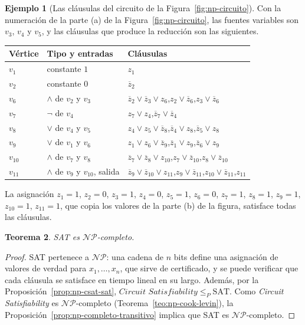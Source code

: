 \documentclass[12pt, spanish, oneside, openany]{book}
\newcommand{\NP}{\mathcal{NP}}
\newcommand{\redp}{\le_{P}}
\newcommand{\prob}[1]{\textit{#1}}
\newcommand{\CSAT}{\prob{Circuit Satisfiability}\xspace}
\newcommand{\nega}[1]{\overline{#1}} %
\theoremstyle{uprightplain}
\newtheorem{teorema}{Teorema}[section]
\theoremstyle{definition}
\newtheorem{ejemplo}[teorema]{Ejemplo}
\theoremstyle{remark}
\theoremstyle{definition}
\begin{document}
\begin{ejemplo}[Las cláusulas del circuito de la Figura~\ref{fig:np-circuito}]
\label{ej:np-circuito-clausulas}
Con la numeración de la parte (a) de la Figura~\ref{fig:np-circuito}, las fuentes variables son $v_3$, $v_4$ y $v_5$, y las cláusulas que produce la reducción son las siguientes.
\begin{center}
\small
\renewcommand{\arraystretch}{1.2}
\begin{tabular}{@{}lll@{}}
\toprule
\textbf{Vértice} & \textbf{Tipo y entradas} & \textbf{Cláusulas}\\
\midrule
$v_1$ & constante $1$ & $z_1$\\
$v_2$ & constante $0$ & $\nega{z}_2$\\
$v_6$ & $\wedge$ de $v_2$ y $v_3$ & $\nega{z}_2\vee\nega{z}_3\vee z_6$,\quad $z_2\vee\nega{z}_6$,\quad $z_3\vee\nega{z}_6$\\
$v_7$ & $\neg$ de $v_4$ & $z_7\vee z_4$,\quad $\nega{z}_7\vee\nega{z}_4$\\
$v_8$ & $\vee$ de $v_4$ y $v_5$ & $z_4\vee z_5\vee\nega{z}_8$,\quad $\nega{z}_4\vee z_8$,\quad $\nega{z}_5\vee z_8$\\
$v_9$ & $\vee$ de $v_1$ y $v_6$ & $z_1\vee z_6\vee\nega{z}_9$,\quad $\nega{z}_1\vee z_9$,\quad $\nega{z}_6\vee z_9$\\
$v_{10}$ & $\wedge$ de $v_7$ y $v_8$ & $\nega{z}_7\vee\nega{z}_8\vee z_{10}$,\quad $z_7\vee\nega{z}_{10}$,\quad $z_8\vee\nega{z}_{10}$\\
$v_{11}$ & $\wedge$ de $v_9$ y $v_{10}$, salida & $\nega{z}_9\vee\nega{z}_{10}\vee z_{11}$,\quad $z_9\vee\nega{z}_{11}$,\quad $z_{10}\vee\nega{z}_{11}$,\quad $z_{11}$\\
\bottomrule
\end{tabular}
\end{center}
La asignación $z_1=1$, $z_2=0$, $z_3=1$, $z_4=0$, $z_5=1$, $z_6=0$, $z_7=1$, $z_8=1$, $z_9=1$, $z_{10}=1$, $z_{11}=1$, que copia los valores de la parte (b) de la figura, satisface todas las cláusulas.
\end{ejemplo}

\begin{teorema}
\label{teo:np-sat-completo}
SAT es $\NP$-completo.
\end{teorema}
\begin{proof}
SAT pertenece a $\NP$: una cadena de $n$ bits define una asignación de valores de verdad para $x_1,\dots,x_n$, que sirve de certificado, y se puede verificar que cada cláusula se satisface en tiempo lineal en su largo. Además, por la Proposición~\ref{prop:np-csat-sat}, $\CSAT\redp\mathrm{SAT}$. Como \CSAT es $\NP$-completo (Teorema~\ref{teo:np-cook-levin}), la Proposición~\ref{prop:np-completo-transitivo} implica que SAT es $\NP$-completo.
\end{proof}
\end{document}
